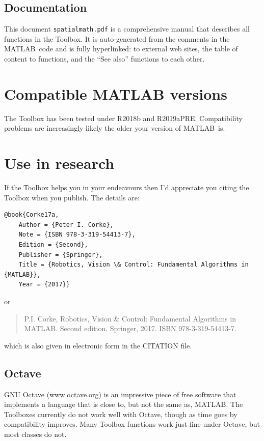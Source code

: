 \documentclass[a4paper,twoside]{report}
\def\Mlab{MATLAB}
\begin{document}
\subsection{Documentation}
This document {\tt spatialmath.pdf} is a comprehensive manual that describes all functions in the Toolbox.
It is auto-generated from the comments in the \Mlab\ code and is fully hyperlinked:
to external web sites, the table of content to functions, and the ``See also'' functions
to each other.



\section{Compatible MATLAB versions}
The Toolbox has been tested under R2018b and R2019aPRE.  Compatibility problems are increasingly likely the older your version of \Mlab\ is.

\section{Use in research}
If the Toolbox helps you in your endeavours then I'd appreciate you citing the Toolbox when you publish.
The details are:
\begin{verbatim}
@book{Corke17a,
    Author = {Peter I. Corke},
    Note = {ISBN 978-3-319-54413-7},
    Edition = {Second},
    Publisher = {Springer},
    Title = {Robotics, Vision \& Control: Fundamental Algorithms in {MATLAB}},
    Year = {2017}}
\end{verbatim}
or
\begin{quote}
P.I. Corke, Robotics, Vision \& Control: Fundamental Algorithms in MATLAB. Second edition. Springer, 2017. ISBN 978-3-319-54413-7.
\end{quote}
which is also given in electronic form in the CITATION file.


\subsection{Octave}
GNU Octave (www.octave.org) is an impressive piece of free software that implements a language that is close to, but not the same as, \Mlab. The Toolboxes currently do not work well with Octave, though as time goes by compatibility improves.  
Many Toolbox functions work just fine under Octave, but most classes do not.
\end{document}

